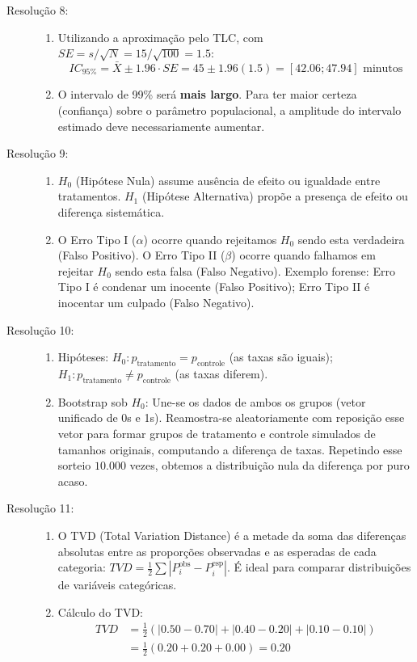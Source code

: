 \documentclass[12pt]{article}
\begin{document}
\begin{description}
    \item[Resolução 8:] 
    \begin{enumerate}[label=\alph*)]
        \item Utilizando a aproximação pelo TLC, com $SE = s/\sqrt{N} = 15/\sqrt{100} = 1.5$:
        $$IC_{95\%} = \bar{X} \pm 1.96 \cdot SE = 45 \pm 1.96(1.5) = [42.06; 47.94] \text{ minutos}$$
        \item O intervalo de 99\% será \textbf{mais largo}. Para ter maior certeza (confiança) sobre o parâmetro populacional, a amplitude do intervalo estimado deve necessariamente aumentar.
    \end{enumerate}

    \item[Resolução 9:] 
    \begin{enumerate}[label=\alph*)]
        \item $H_0$ (Hipótese Nula) assume ausência de efeito ou igualdade entre tratamentos. $H_1$ (Hipótese Alternativa) propõe a presença de efeito ou diferença sistemática.
        \item O Erro Tipo I ($\alpha$) ocorre quando rejeitamos $H_0$ sendo esta verdadeira (Falso Positivo). O Erro Tipo II ($\beta$) ocorre quando falhamos em rejeitar $H_0$ sendo esta falsa (Falso Negativo). Exemplo forense: Erro Tipo I é condenar um inocente (Falso Positivo); Erro Tipo II é inocentar um culpado (Falso Negativo).
    \end{enumerate}

    \item[Resolução 10:] 
    \begin{enumerate}[label=\alph*)]
        \item Hipóteses: $H_0: p_{\text{tratamento}} = p_{\text{controle}}$ (as taxas são iguais); $H_1: p_{\text{tratamento}} \neq p_{\text{controle}}$ (as taxas diferem).
        \item Bootstrap sob $H_0$: Une-se os dados de ambos os grupos (vetor unificado de 0s e 1s). Reamostra-se aleatoriamente com reposição esse vetor para formar grupos de tratamento e controle simulados de tamanhos originais, computando a diferença de taxas. Repetindo esse sorteio $10.000$ vezes, obtemos a distribuição nula da diferença por puro acaso.
    \end{enumerate}

    \item[Resolução 11:] 
    \begin{enumerate}[label=\alph*)]
        \item O TVD (Total Variation Distance) é a metade da soma das diferenças absolutas entre as proporções observadas e as esperadas de cada categoria: $TVD = \frac{1}{2}\sum |P_i^{\text{obs}} - P_i^{\text{esp}}|$. É ideal para comparar distribuições de variáveis categóricas.
        \item Cálculo do TVD:
        \begin{align*}
        TVD &= \frac{1}{2} \left( |0.50 - 0.70| + |0.40 - 0.20| + |0.10 - 0.10| \right) \\
        &= \frac{1}{2} (0.20 + 0.20 + 0.00) = \mathbf{0.20}
        \end{align*}
    \end{enumerate}


\end{description}
\end{document}
